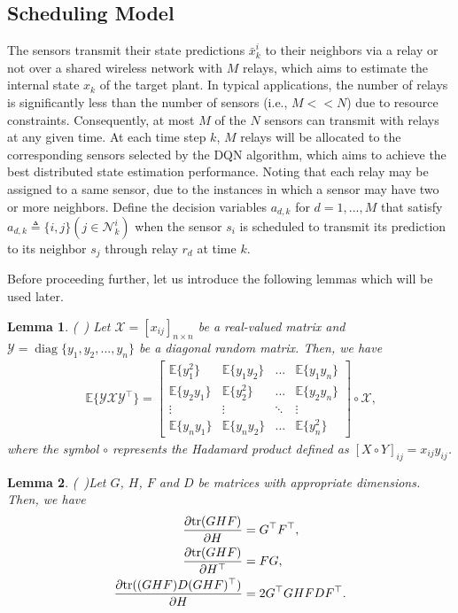 \documentclass[twocolumn]{IEEEtran}
\newtheorem{lemma}{Lemma}
\newcommand{\tr}{{\rm tr}}
\begin{document}
\subsection{Scheduling Model}
The sensors transmit their state predictions $\bar{x}_{k}^{i}$ to their neighbors via a relay or not over a shared wireless network with $M$ relays, which aims to estimate the internal state $x_{k}$ of the target plant. In typical applications, the number of relays is significantly less than the number of sensors (i.e., $M<<N$) due to resource constraints. Consequently, at most $M$ of the $N$ sensors can transmit with relays at any given time. At each time step $k$, $M$ relays will be allocated to the corresponding sensors selected by the DQN algorithm, which aims to achieve the best distributed state estimation performance. Noting that each relay may be assigned to a same sensor, due to the instances in which a sensor may have two or more neighbors. Define the decision variables $a_{d,k}$ for $d=1,...,M$ that satisfy $a_{d,k}\triangleq\{i,j\}(j\in \mathcal{N}_{k}^i)$ when the sensor $s_i$ is scheduled to transmit its prediction to its neighbor $s_j$ through relay $r_d$ at time $k$. 

Before proceeding further, let us introduce the following lemmas which will be used later.

\begin{lemma}(\cite{Topic in matrix analysis}~) \label{hada}
Let $\mathcal{X}=[x_{ij}]_{n\times n}$ be a real-valued matrix and $\mathcal{Y}=
\operatorname{diag}\{y_1,y_2,...,y_n\}$ be a diagonal random matrix. Then, we have
\begin{align*}
\mathbb{E}\{\mathcal{Y}\mathcal{X}\mathcal{Y}^\top \}=\begin{bmatrix}\mathbb{E}\{y_1^2\}&\mathbb{E}\{y_1y_2\}&...&\mathbb{E}\{y_1y_n\}\\\mathbb{E}\{y_2y_1\}&\mathbb{E}\{y_2^2\}&...&\mathbb{E}\{y_2y_n\}\\\vdots&\vdots&\ddots&\vdots\\\mathbb{E}\{y_ny_1\}&\mathbb{E}\{y_ny_2\}&...&\mathbb{E}\{y_n^2\}\end{bmatrix}\circ\mathcal{X} \text{,}
\end{align*}
where the symbol $\circ$ represents the Hadamard product defined as $[X\circ Y]_{ij}=x_{ij}y_{ij}$.
\end{lemma}

\begin{lemma}(\cite{chen2021event}~)\label{derivation}
Let \( G \), \( H \), \( F \) and \( D \) be matrices with appropriate dimensions. Then, we have
\begin{align*}
\frac{\partial \tr(GHF)}{\partial H} &= G^\top F^\top, \\
\frac{\partial \tr(GHF)}{\partial H^\top} &= FG, \\
\frac{\partial \tr((GHF)D(GHF)^\top)}{\partial H} &= 2G^\top GHFDF^\top.
\end{align*}
\end{lemma}
\end{document}
